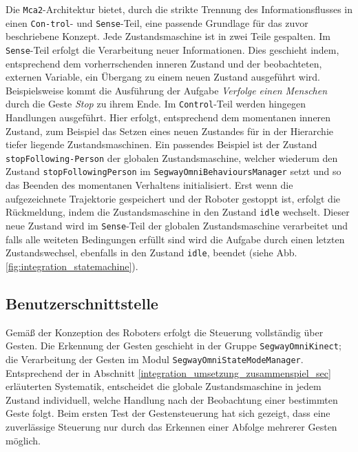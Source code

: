 Die \lstinline{Mca2}-Architektur bietet, durch die strikte Trennung des Informationsflusses in 
einen \lstinline{Con-trol}- und \lstinline{Sense}-Teil, eine passende Grundlage
für das zuvor beschriebene Konzept. Jede Zustandsmaschine ist in zwei Teile gespalten. Im \lstinline{Sense}-Teil 
erfolgt die Verarbeitung neuer Informationen. Dies geschieht indem, entsprechend dem vorherrschenden 
inneren Zustand und der beobachteten, externen Variable, ein Übergang zu einem neuen Zustand 
ausgeführt wird. Beispielsweise kommt die Ausführung der Aufgabe \textit{Verfolge einen Menschen} 
durch die Geste \textit{Stop} zu ihrem Ende. Im \lstinline{Control}-Teil werden hingegen 
Handlungen ausgeführt. Hier erfolgt, entsprechend dem momentanen inneren Zustand, zum Beispiel 
das Setzen eines neuen Zustandes für in der Hierarchie tiefer liegende Zustandsmaschinen. 
Ein passendes Beispiel ist der Zustand \lstinline{stopFollowing-Person} der
globalen Zustandsmaschine, welcher wiederum den Zustand \lstinline{stopFollowingPerson} im
\lstinline{SegwayOmniBehavioursManager} setzt und so das Beenden des momentanen Verhaltens initialisiert. Erst wenn die aufgezeichnete 
Trajektorie gespeichert und der Roboter gestoppt ist, erfolgt die Rückmeldung, indem die 
Zustandsmaschine in den Zustand \lstinline{idle} wechselt. Dieser neue Zustand wird 
im \lstinline{Sense}-Teil der globalen Zustandsmaschine verarbeitet und falls alle weiteten 
Bedingungen erfüllt sind wird die Aufgabe durch einen letzten Zustandswechsel, ebenfalls in 
den Zustand \lstinline{idle}, beendet (siehe Abb. \ref{fig:integration_statemachine}).


\subsection{Benutzerschnittstelle}
\label{benutzerschnittstelle_integration_cha}

Gemäß der Konzeption des Roboters erfolgt die Steuerung vollständig über Gesten. Die Erkennung der Gesten 
geschieht in der Gruppe \lstinline{SegwayOmniKinect}; die Verarbeitung der Gesten im Modul \lstinline{SegwayOmniStateModeManager}. Entsprechend der in Abschnitt \ref{integration_umsetzung_zusammenspiel_sec}
 erläuterten Systematik, entscheidet die globale Zustandsmaschine in jedem Zustand individuell, welche Handlung 
 nach der Beobachtung einer bestimmten Geste folgt. Beim ersten Test der Gestensteuerung hat sich gezeigt, 
 dass eine zuverlässige Steuerung nur durch das Erkennen einer Abfolge mehrerer Gesten möglich. 

